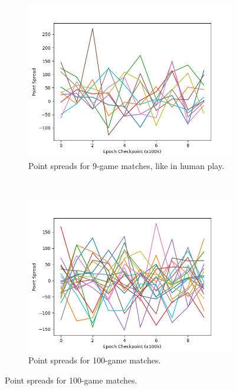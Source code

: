
\begin{figure}
\center
\begin{subfigure}[b]{0.66\textwidth}
	\center
	\includegraphics[height=0.22\textheight]{images/discussion/usefulness/r2-time-series-9.png}
	\caption{Point spreads for 9-game matches, like in human play.}
	\label{r2-time-series-9}
\end{subfigure}
~
\begin{subfigure}[b]{0.66\textwidth}
	\center
	\includegraphics[height=0.22\textheight]{images/discussion/usefulness/r2-time-series-100.png}
	\caption{Point spreads for 100-game matches.}
	\label{r2-time-series-100}
\end{subfigure}


\end{figure}
